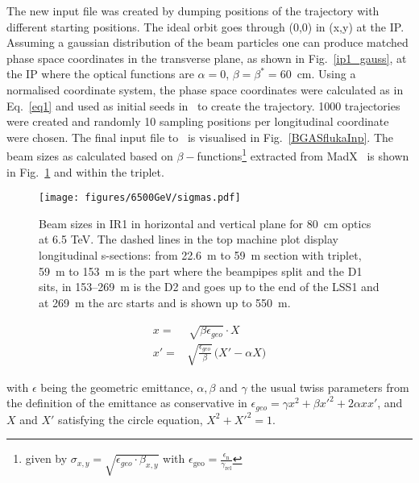 The new input file was created by dumping positions of the trajectory with different starting positions. The ideal orbit goes through (0,0) in (x,y) at the IP. Assuming a gaussian distribution of the beam particles one can produce matched phase space coordinates in the transverse plane, as shown in Fig.~\ref{ip1_gauss}, at the IP where the optical functions are $\alpha = 0$, $\beta = \beta^* = 60$~cm. Using a normalised coordinate system, the phase space coordinates were calculated as in Eq.~\ref{eq1} and used as initial seeds in \fluka~to create the trajectory. 1000 trajectories were created and randomly 10 sampling positions per longitudinal coordinate were chosen. The final input file to \fluka~is visualised in Fig.~\ref{BGASflukaInp}. The beam sizes as calculated based on $\beta-$functions\footnote{given by $\sigma_{x,y} = \sqrt{\epsilon_{geo} \cdot \beta_{x,y}}$ with $\epsilon_{\textrm{geo}} = \frac{ \epsilon_{\textrm{n}}}{\gamma_{\textrm{rel}}}$} extracted from MadX~\cite{madx} is shown in Fig.~\ref{twissfileBS} and within the triplet.


\begin{figure}%
\begin{center}
  \texttt{[image: figures/6500GeV/sigmas.pdf]}
\end{center}
\vspace{-0.6cm}
 \caption{Beam sizes in IR1 in horizontal and vertical plane for 80~cm optics at 6.5 TeV. The dashed lines in the top machine plot display longitudinal s-sections: from 22.6~m to 59~m section with triplet, 59~m to 153~m is the part where the beampipes split and the D1 sits, in 153--269~m is the D2 and goes up to the end of the LSS1 and at 269~m the arc starts and is shown up to 550~m.
  \label{twissfileBS}}
\end{figure}
 
\begin{equation} \label{eq1}
  \begin{split}
x = & \, \sqrt{\beta \epsilon_{geo}} \cdot X \\
x' = & \sqrt{\frac{\epsilon_{geo}}{\beta}} \, \big( X' - \alpha X \big)
  \end{split}
\end{equation}

with $\epsilon$ being the geometric emittance, $\alpha, \beta$ and $\gamma$ the usual twiss parameters from the definition of the emittance as conservative in $\epsilon_{geo} = \gamma x^2 + \beta x'^2 + 2 \alpha x x'$, and $X$ and $X'$ satisfying the circle equation, $X^2 + X'^2 = 1$. 


